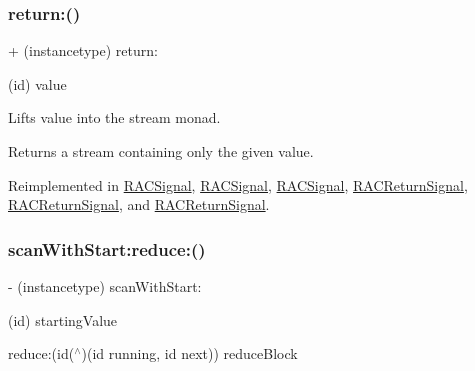 \mbox{\label{interface_r_a_c_stream_ab3497f3cf2f0d43e90d375dc26ed12ba}} 
\subsubsection{\texorpdfstring{return\+:()}{return:()}\hspace{0.1cm}{\footnotesize\ttfamily [3/3]}}
{\footnotesize\ttfamily + (instancetype) return\+: \begin{DoxyParamCaption}\item[{(id)}]{value }\end{DoxyParamCaption}}

Lifts {\ttfamily value} into the stream monad.

Returns a stream containing only the given value. 

Reimplemented in \mbox{\hyperlink{interface_r_a_c_signal_a41b2f3cea45bb3a14911299cb572b7d9}{R\+A\+C\+Signal}}, \mbox{\hyperlink{interface_r_a_c_signal_a41b2f3cea45bb3a14911299cb572b7d9}{R\+A\+C\+Signal}}, \mbox{\hyperlink{interface_r_a_c_signal_a41b2f3cea45bb3a14911299cb572b7d9}{R\+A\+C\+Signal}}, \mbox{\hyperlink{interface_r_a_c_return_signal_acaf96978eeb78adb2409b717f26ce665}{R\+A\+C\+Return\+Signal}}, \mbox{\hyperlink{interface_r_a_c_return_signal_acaf96978eeb78adb2409b717f26ce665}{R\+A\+C\+Return\+Signal}}, and \mbox{\hyperlink{interface_r_a_c_return_signal_acaf96978eeb78adb2409b717f26ce665}{R\+A\+C\+Return\+Signal}}.

\mbox{\label{interface_r_a_c_stream_aa86990e9bc4cbc3dff2815f56b907b41}} 
\subsubsection{\texorpdfstring{scan\+With\+Start\+:reduce\+:()}{scanWithStart:reduce:()}\hspace{0.1cm}{\footnotesize\ttfamily [1/3]}}
{\footnotesize\ttfamily -\/ (instancetype) scan\+With\+Start\+: \begin{DoxyParamCaption}\item[{(id)}]{starting\+Value }\item[{reduce:(id($^\wedge$)(id running, id next))}]{reduce\+Block }\end{DoxyParamCaption}}

